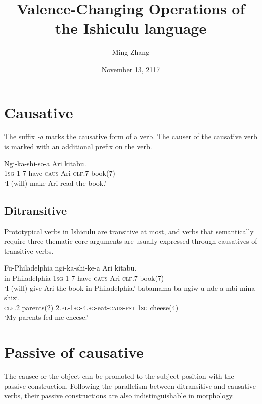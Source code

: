\documentclass[12pt, oneside]{article}
\title{Valence-Changing Operations of the Ishiculu language}
\author{Ming Zhang}
\date{November 13, 2117}
\let\ipa\textipa
\begin{document}
\maketitle

\section{Causative}

The suffix \textit{-\textbeltl a} marks the causative form of a verb. The causer of the causative verb is marked with an additional prefix on the verb.

\begin{exe}
\ex
\gll Ngi-ka-shi-so-\ipa{\textbeltl}a Ari \ipa{nta\textbeltl o} kitabu. \\
\textsc{1sg}-\textsc{1}-\textsc{7}-have-\textsc{caus} Ari \textsc{clf}.7 book(7) \\
\trans `I (will) make Ari read the book.'
\end{exe}

\subsection{Ditransitive}

Prototypical verbs in Ishiculu are transitive at most, and verbs that semantically require three thematic core arguments are usually expressed through causatives of transitive verbs.

\begin{exe}
\ex
\gll Fu-Philadelphia ngi-ka-shi-ke-\ipa{\textbeltl}a Ari \ipa{nta\textbeltl o} kitabu. \\
in-Philadelphia \textsc{1sg}-\textsc{1}-\textsc{7}-have-\textsc{caus} Ari \textsc{clf}.7 book(7) \\
\trans `I (will) give Ari the book in Philadelphia.'
\ex
{} babamama ba-ngiw-u-nde-\ipa{\textbeltl}a-mbi mina shizi. \\
\textsc{clf.2} parents(2) \textsc{2.pl}-\textsc{1sg}-\textsc{4.sg}-eat-\textsc{caus}-\textsc{pst} \textsc{1sg} cheese(4) \\
\trans `My parents fed me cheese.'
\end{exe}

\section{Passive of causative}

The causee or the object can be promoted to the subject position with the passive construction. Following the parallelism between ditransitive and causative verbs, their passive constructions are also indistinguishable in morphology.
\end{document}
